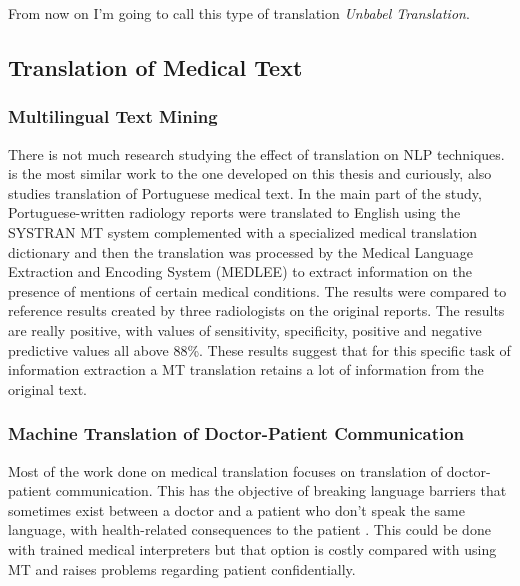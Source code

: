 From now on I'm going to call this type of translation \textit{Unbabel Translation}.
 

\subsection{Translation of Medical Text}


\subsubsection{Multilingual Text Mining}

There is not much research studying the effect of translation on NLP techniques. \citep{Castilla2007a} is the most similar work to the one developed on this thesis and curiously, also studies translation of Portuguese medical text. In the main part of the study, Portuguese-written radiology reports were translated to English using the SYSTRAN MT system complemented with a specialized medical translation dictionary and then the translation was processed by the Medical Language Extraction and Encoding System (MEDLEE) to extract information on the presence of mentions of certain medical conditions. The results were compared to reference results created by three radiologists on the original reports. The results are really positive, with values of sensitivity, specificity, positive and negative predictive values all above 88\%. These results suggest that for this specific task of information extraction a MT translation retains a lot of information from the original text. 


\subsubsection{Machine Translation of Doctor-Patient Communication}

Most of the work done on medical translation focuses on translation of doctor-patient communication. This has the objective of breaking language barriers that sometimes exist between a doctor and a patient who don't speak the same language, with health-related consequences to the patient \citep{Schyve2007}. This could be done with trained medical interpreters but that option is costly compared with using MT and raises problems regarding patient confidentially. 

